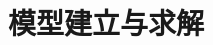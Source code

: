 \section{模型建立与求解}
\begingroup
\let\shumooriginalclearpage\clearpage
\let\clearpage\relax



\let\clearpage\shumooriginalclearpage

\endgroup
